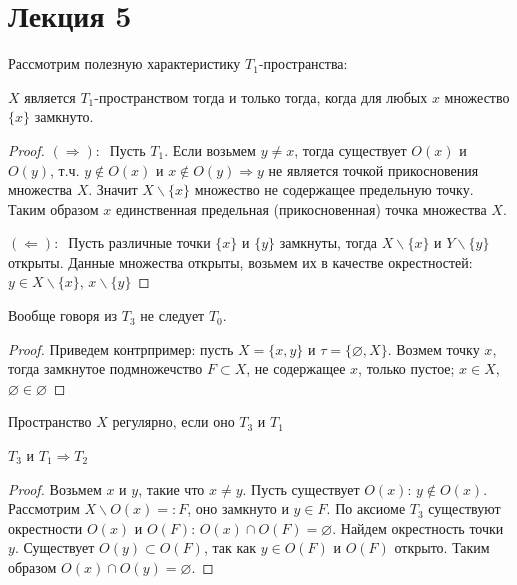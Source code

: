 \section{Лекция 5}


Рассмотрим полезную характеристику $T_1$-пространства: 

\begin{statement}
    $X$ является $T_1$-пространством тогда и только тогда, когда для любых $x$ множество $\{x\}$ замкнуто.      
\end{statement}
\begin{proof}
    $(\Rightarrow):\ $ Пусть $T_1$. Если возьмем $y \neq x$, тогда существует $O(x)$ и $O(y)$, т.ч. $y \not\in O(x)$ и $x \not\in O(y) \Longrightarrow y$ не является точкой прикосновения множества $X$. Значит $X\backslash \{x\}$ множество не содержащее предельную точку. Таким образом $x$ единственная предельная (прикосновенная) точка множества $X$.

    $(\Leftarrow):\ $ Пусть различные точки $\{x\}$ и $\{y\}$ замкнуты, тогда $X\backslash \{x\}$ и $Y\backslash \{y\}$ открыты. Данные множества открыты, возьмем их в качестве окрестностей: $y \in X\backslash\{x\}$, $x \backslash\{y\}$ 
\end{proof}

\begin{statement}
    Вообще говоря из $T_3$ не следует $T_0$.  
\end{statement}
\begin{proof}
    Приведем контрпример: пусть $X = \{x, y\}$ и $\tau = \{\varnothing, X\}$. Возмем точку $x$, тогда замкнутое подмножечство $F \subset X$, не содержащее $x$, только пустое; $x \in X$, $\varnothing \in \varnothing$  
\end{proof}

\begin{definition}
    Пространство $X$ регулярно, если оно $T_3$ и $T_1$   
\end{definition}

\begin{statement}
    $T_3$ и $T_1 \Rightarrow T_2$
\end{statement}
\begin{proof}
    Возьмем $x$ и $y$, такие что $x \neq y$. Пусть существует $O(x)$: $y \not\in O(x)$. Рассмотрим $X\backslash O(x) =: F$, оно замкнуто и $y \in F$. По аксиоме $T_3$ существуют окрестности $O(x)$ и $O(F)$: $O(x) \cap O(F) = \varnothing$. Найдем окрестность точки $y$. Существует $O(y) \subset O(F)$, так как $y \in O(F)$ и $O(F)$ открыто. Таким образом $O(x) \cap O(y) = \varnothing$.
\end{proof}

